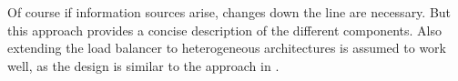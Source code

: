 Of course if information sources arise, changes down the line are necessary.
But this approach provides a concise description of the different components.
Also extending the load balancer to heterogeneous architectures is assumed to
work well, as the design is similar to the approach in
\cite{sarma_smartbalance_2015}.


\begin{comment}

\paragraph{Topology description}
Represents the cache and core layout of the CPU.
On Haswell it consist of a package description containing core descriptions.
A core description consists of the hardware assigned APIC\_id, the kernel
assigned fiasco\_id, and the SMT abstraction.
It can be expanded to include multi-socket systems by adding more package
descriptions.
It maps the fiasco view on the cores onto the actual HW topology and uses CPUID
to determine corresponding logical cores.

\paragraph{Thread\_t}
is the administrative representation of a L4-thread.
It contains not only of the thread parameters passed via run\_thread(), but
also measurements for the current and last interval.
LLC-misses, execution time, an identifier, and the cores it currently runs on
and will run on in the next interval.

\end{comment}
